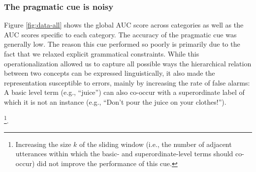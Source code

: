 \documentclass[english,,man,floatsintext]{apa6}
\let\rmarkdownfootnote\footnote%
\def\footnote{\protect\rmarkdownfootnote}
\begin{document}
\hypertarget{the-pragmatic-cue-is-noisy}{%
\subsubsection{The pragmatic cue is noisy}\label{the-pragmatic-cue-is-noisy}}

Figure \ref{fig:data-all} shows the global AUC score across categories as well as the AUC
scores specific to each category. The accuracy of the pragmatic cue was
generally low. The reason this cue performed so poorly is primarily due
to the fact that we relaxed explicit grammatical constraints. While this
operationalization allowed us to capture all possible ways the
hierarchical relation between two concepts can be expressed
linguistically, it also made the representation susceptible to errors,
mainly by increasing the rate of false alarms: A basic level term (e.g.,
\enquote{juice}) can also co-occur with a superordinate label of which it is
not an instance (e.g., \enquote{Don't pour the juice on your clothes!}).

\footnote{Increasing the size $k$ of the sliding window (i.e., the number
of adjacent utterances within which the basic- and superordinate-level
terms should co-occur) did not improve the performance of this cue.}.
\end{document}
